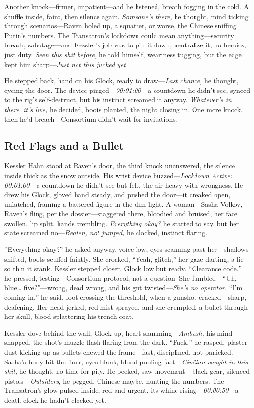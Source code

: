 \documentclass[12pt]{book}
\begin{document}
Another knock—firmer, impatient—and he listened, breath fogging in the cold. A shuffle inside, faint, then silence again. \textit{Someone’s there,} he thought, mind ticking through scenarios—Raven holed up, a squatter, or worse, the Chinese sniffing Putin’s numbers. The Transatron’s lockdown could mean anything—security breach, sabotage—and Kessler’s job was to pin it down, neutralize it, no heroics, just duty. \textit{Seen this shit before,} he told himself, weariness tugging, but the edge kept him sharp—\textit{Just not this fucked yet.}

He stepped back, hand on his Glock, ready to draw—\textit{Last chance,} he thought, eyeing the door. The device pinged—\textit{00:01:00}—a countdown he didn’t see, synced to the rig’s self-destruct, but his instinct screamed it anyway. \textit{Whatever’s in there, it’s live,} he decided, boots planted, the night closing in. One more knock, then he’d breach—Consortium didn’t wait for invitations.

\subsection{Red Flags and a Bullet}

Kessler Hahn stood at Raven’s door, the third knock unanswered, the silence inside thick as the snow outside. His wrist device buzzed—\textit{Lockdown Active: 00:01:00}—a countdown he didn’t see but felt, the air heavy with wrongness. He drew his Glock, gloved hand steady, and pushed the door—it creaked open, unlatched, framing a battered figure in the dim light. A woman—Sasha Volkov, Raven’s fling, per the dossier—staggered there, bloodied and bruised, her face swollen, lip split, hands trembling. \textit{Everything okay?} he started to say, but her state screamed no—\textit{Beaten, not jumped,} he clocked, instinct flaring.

“Everything okay?” he asked anyway, voice low, eyes scanning past her—shadows shifted, boots scuffed faintly. She croaked, “Yeah, glitch,” her gaze darting, a lie so thin it stank. Kessler stepped closer, Glock low but ready. “Clearance code,” he pressed, testing—Consortium protocol, not a question. She fumbled—“Uh, blue… five?”—wrong, dead wrong, and his gut twisted—\textit{She’s no operator.} “I’m coming in,” he said, foot crossing the threshold, when a gunshot cracked—sharp, deafening. Her head jerked, red mist sprayed, and she crumpled, a bullet through her skull, blood splattering his trench coat.

Kessler dove behind the wall, Glock up, heart slamming—\textit{Ambush,} his mind snapped, the shot’s muzzle flash flaring from the dark. “Fuck,” he rasped, plaster dust kicking up as bullets chewed the frame—fast, disciplined, not panicked. Sasha’s body hit the floor, eyes blank, blood pooling fast—\textit{Civilian caught in this shit,} he thought, no time for pity. He peeked, saw movement—black gear, silenced pistols—\textit{Outsiders,} he pegged, Chinese maybe, hunting the numbers. The Transatron’s glow pulsed inside, red and urgent, its whine rising—\textit{00:00:50}—a death clock he hadn’t clocked yet.
\end{document}
